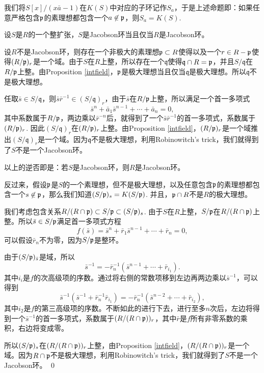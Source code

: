我们将$S[x]/(x\bar{a}-1)$在$K(S)$中对应的子环记作$S_a$，于是上述命题即：如果任意严格包含$\mathfrak{p}$的素理想都包含一个$a\not\in \mathfrak{p}$，则$S_a=K(S)$. 

\pro 设$S$是$R$的一个整扩张，$S$是Jacobson环当且仅当$R$是Jacobson环。

\proof
	设$R$不是Jacobson环，则存在一个非极大的素理想$\mathfrak{p}\subset R$使得以及一个$r\in R-\mathfrak{p}$使得$(R/\mathfrak{p})_r$是一个域。由于$S$在$R$上整，所以存在一个$\mathfrak{q}$使得$\mathfrak{q}\cap R=\mathfrak{p}$，并且$S/\mathfrak{q}$在$R/\mathfrak{p}$上整。由Proposition \eqref{intfield}，$\mathfrak{p}$是极大理想当且仅当$\mathfrak{q}$是极大理想。所以$\mathfrak{q}$不是极大理想。

	任取$\bar{s}\in S/\mathfrak{q}$，则$\bar{s}\bar{r}^{-1}\in (S/\mathfrak{q})_r$，由于$\bar{s}$在$R/\mathfrak{p}$上整，所以满足一个首一多项式
	\[
	\bar{s}^n+\bar{a}_1\bar{s}^{n-1}+\cdots+ \bar{a}_n=0,
	\]
	其中系数属于$R/\mathfrak{p}$，两边乘以$\bar{r}^{-n}$后，就得到了一个$\bar{s}\bar{r}^{-1}$的首一多项式，系数属于$(R/\mathfrak{p})_r$. 因此$(S/\mathfrak{q})_r$在$(R/\mathfrak{p})_r$上整。由Proposition \eqref{intfield}，$(R/\mathfrak{p})_r$是一个域推出$(S/\mathfrak{q})_r$是一个域。因为$\mathfrak{q}$不是极大理想，利用Robinowitch's trick，我们就得到了$S$不是一个Jacobson环。

	以上的逆否即是：若$S$是Jacobson环，则$R$是Jacobson环。

	反过来，假设$\mathfrak{p}$是$S$的一个素理想，但不是极大理想，以及任意包含$\mathfrak{p}$的素理想都包含一个$s\not\in \mathfrak{p}$，那么我们知道$(S/\mathfrak{p})_{s}=K(S/\mathfrak{p})$. 并且，$\mathfrak{p} \cap R$不是$R$的极大理想。

	我们考虑包含关系$R/(R\cap \mathfrak{p})\subset S/\mathfrak{p}\subset (S/\mathfrak{p})_{s}$. 由于$S$在$R$上整，$S/\mathfrak{p}$在$R/(R\cap \mathfrak{p})$上整。所以$\bar{s}\in S/\mathfrak{p}$满足首一多项式方程
	\[
	f(\bar{s})=\bar{s}^n+\bar{r}_1\bar{s}^{n-1}+\cdots+\bar{r}_n=0,
	\]
	可以假设$\bar{r}_n$不为零，因为$S/\mathfrak{p}$是整环。

	由于$(S/\mathfrak{p})_{\bar{s}}$是域，所以
	\[
	\bar{s}^{-1}=-\bar{r}_n^{-1}(\bar{s}^{n-1}+\cdots+\bar{r}_{i_1}).
	\]
	其中$i_i$是$f$的次高级项的序数。通过将右侧的常数项移到左边再两边乘以$\bar{s}^{-1}$，可以得到
	\[
	\bar{s}^{-1}(\bar{s}^{-1}+\bar{r}_n^{-1}\bar{r}_{i_1})=-\bar{r}_n^{-1}(\bar{s}^{n-2}+\cdots+\bar{r}_{i_2}),
	\]
	其中$i_2$是$f$的第三高级项的序数。不断如此的进行下去，进行至多$n$次后，左边将得到一个$\bar{s}^{-1}$的首一多项式，系数属于$(R/(R\cap \mathfrak{p}))_{r}$，其中$\bar{r}$是$f$所有非零系数的乘积，右边将变成零。

	所以$(S/\mathfrak{p})_{s}$在$(R/(R\cap \mathfrak{p}))_{r}$上整，由Proposition \eqref{intfield}，$(R/(R\cap \mathfrak{p}))_{r}$是一个域。因为$R\cap \mathfrak{p}$不是极大理想，利用Robinowitch's trick，我们就得到了$S$不是一个Jacobson环。
\qed

